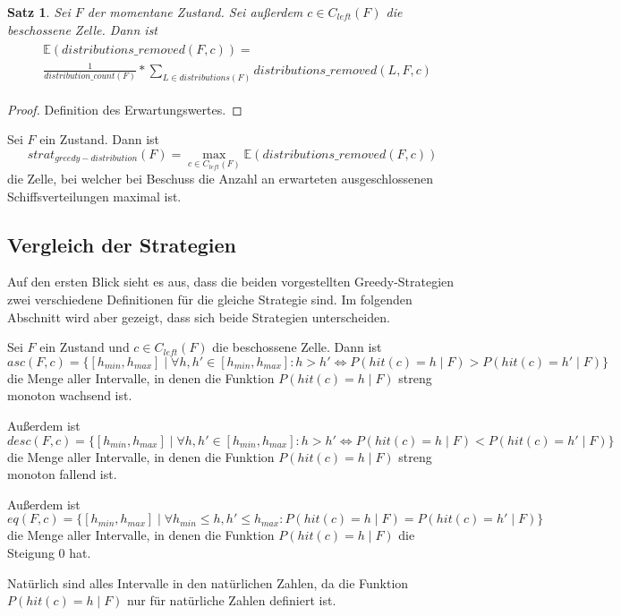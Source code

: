 \documentclass[a4paper,12pt]{llncs}
\numberwithin{equation}{section}
\newtheorem{satz}{Satz}
\begin{document}
\begin{satz}
Sei $F$ der momentane Zustand.
Sei außerdem $c \in C_{left}(F)$ die beschossene Zelle.
Dann ist
\begin{align}
\begin{split}
&\mathds{E}(distributions\_removed(F,c))=\\
&\frac{1}{distribution\_count(F)} * \sum_{L \in distributions(F)} distributions\_removed(L, F, c) \nonumber
\end{split}
\end{align}
\end{satz}

\begin{proof}
Definition des Erwartungswertes.
\end{proof}

\begin{definition}
Sei $F$ ein Zustand.
Dann ist
\[
strat_{greedy-distribution}(F)=\max_{c \in C_{left}(F)} \mathds{E}(distributions\_removed(F,c))
\]
die Zelle, bei welcher bei Beschuss die Anzahl an erwarteten ausgeschlossenen Schiffsverteilungen maximal ist.
\end{definition}

\subsection{Vergleich der Strategien}
Auf den ersten Blick sieht es aus, dass die beiden vorgestellten Greedy-Strategien zwei verschiedene Definitionen für die gleiche Strategie sind. Im folgenden Abschnitt wird aber gezeigt, dass sich beide Strategien unterscheiden.

\begin{definition}
Sei $F$ ein Zustand und $c \in C_{left}(F)$ die beschossene Zelle.
Dann ist
\[
asc(F, c)=\{[h_{min}, h_{max}] \mid \forall h,h' \in [h_{min}, h_{max}]  \colon h > h' \Leftrightarrow P(hit(c)=h \mid F) > P(hit(c)=h' \mid F)\}
\] die Menge aller Intervalle, in denen die Funktion $P(hit(c)=h \mid F)$ streng monoton wachsend ist.

Außerdem ist
\[
desc(F, c)=\{[h_{min}, h_{max}] \mid \forall h,h' \in [h_{min}, h_{max}] \colon h > h' \Leftrightarrow P(hit(c)=h \mid F) < P(hit(c)=h' \mid F)\}
\] die Menge aller Intervalle, in denen die Funktion $P(hit(c)=h \mid F)$ streng monoton fallend ist.

Außerdem ist
\[
eq(F, c)=\{[h_{min}, h_{max}] \mid \forall h_{min} \leq h,h' \leq h_{max} \colon P(hit(c)=h \mid F) = P(hit(c)=h' \mid F)\}
\] die Menge aller Intervalle, in denen die Funktion $P(hit(c)=h \mid F)$ die Steigung 0 hat.

Natürlich sind alles Intervalle in den natürlichen Zahlen, da die Funktion $P(hit(c)=h \mid F)$ nur für natürliche Zahlen definiert ist.
\end{definition}
\end{document}
